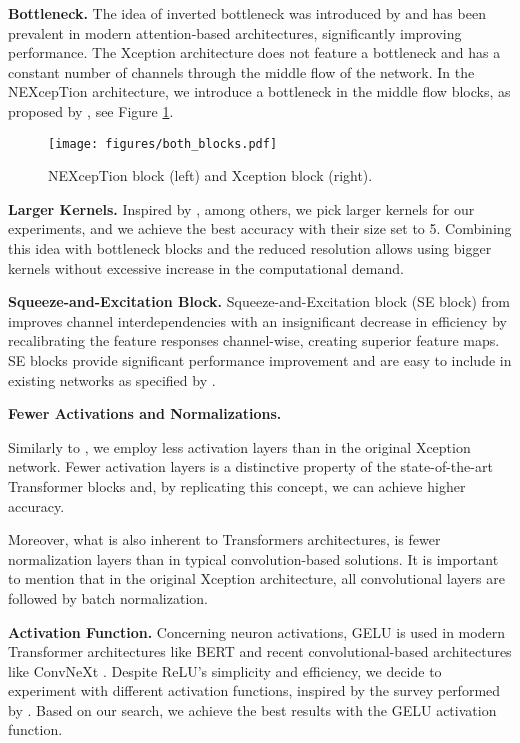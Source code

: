 \textbf{Bottleneck.}
The idea of inverted bottleneck was introduced by \citet{SandlerZhu2018} and has been prevalent in modern attention-based architectures, significantly improving performance. 
The Xception architecture does not feature a bottleneck and has a constant number of channels through the middle flow of the network. In the NEXcepTion architecture, we introduce a bottleneck in the middle flow blocks, as proposed by \citet{LiuEtAl2022}, see Figure \ref{fig:NEXcepTion Block and Xception Block}.


\begin{figure}[h]
    \centering
    \texttt{[image: figures/both\_blocks.pdf]}
    \caption{NEXcepTion block (left) and Xception block (right).}
    \label{fig:NEXcepTion Block and Xception Block}
\end{figure}

\textbf{Larger Kernels.}
Inspired by \citet{LiuEtAl2022}, among others, we pick larger kernels for our experiments, and we achieve the best accuracy with their size set to 5. Combining this idea with bottleneck blocks and the reduced resolution allows using bigger kernels without excessive increase in the computational demand.

\newpage
\textbf{Squeeze-and-Excitation Block.}
Squeeze-and-Excitation block (SE block) from \citet{HuEtAl2017} improves channel interdependencies with an insignificant decrease in efficiency by recalibrating the feature responses channel-wise, creating superior feature maps. SE blocks provide significant performance improvement and are easy to include in existing networks as specified by \citet{HuEtAl2017}. 

\textbf{Fewer Activations and Normalizations.}

Similarly to \citet{LiuEtAl2022}, we employ less activation layers than in the original Xception network. Fewer activation layers is a distinctive property of the state-of-the-art Transformer blocks and, by replicating this concept, we can achieve higher accuracy.

Moreover, what is also inherent to Transformers architectures, is fewer normalization layers than in typical convolution-based solutions. It is important to mention that in the original Xception architecture, all convolutional layers are followed by batch normalization. 



\textbf{Activation Function.} 
Concerning neuron activations, GELU \citep{HenGim2016} is used in modern Transformer architectures like BERT \citep{DevEtAl2018} and recent convolutional-based architectures like ConvNeXt \citep{LiuEtAl2022}.
Despite ReLU's simplicity and efficiency, we decide to experiment with different activation functions, inspired by the survey performed by \citet{DubeyEtAl2021}. Based on our search, we achieve the best results with the GELU activation function.


